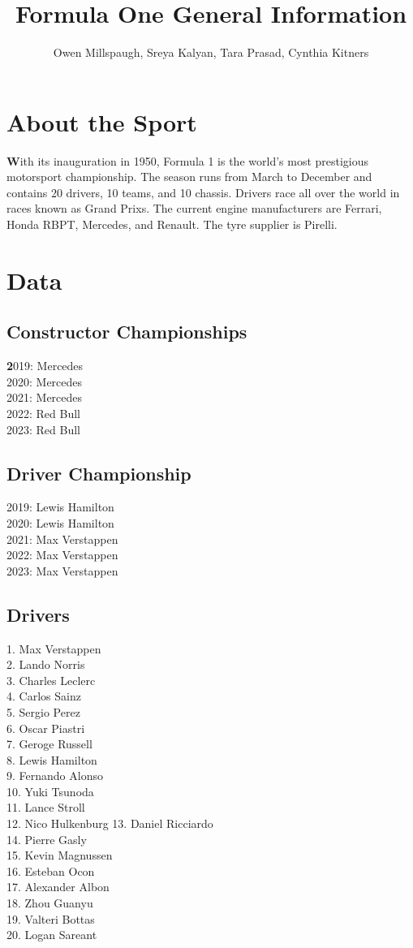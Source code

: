 \documentclass[12pt]{article}
\title{Formula One General Information}
\author{Owen Millspaugh, Sreya Kalyan, Tara Prasad, Cynthia Kitners}
\begin{document}
\maketitle

\section{About the Sport}
\textbf With its inauguration in 1950, Formula 1 is the world's most prestigious motorsport championship. 
The season runs from March to December and contains 20 drivers, 10 teams, and 10 chassis.
Drivers race all over the world in races known as Grand Prixs.
The current engine manufacturers are Ferrari, Honda RBPT, Mercedes, and Renault. 
The tyre supplier is Pirelli.
\section{Data}
\subsection{Constructor Championships}
\textbf 2019: Mercedes\\
2020: Mercedes\\
2021: Mercedes\\
2022: Red Bull\\
2023: Red Bull
\subsection{Driver Championship}
2019: Lewis Hamilton\\
2020: Lewis Hamilton\\
2021: Max Verstappen\\
2022: Max Verstappen\\
2023: Max Verstappen
\subsection{Drivers}
1. Max Verstappen\\
2. Lando Norris\\
3. Charles Leclerc\\
4. Carlos Sainz\\
5. Sergio Perez\\
6. Oscar Piastri\\
7. Geroge Russell\\
8. Lewis Hamilton\\
9. Fernando Alonso\\
10. Yuki Tsunoda\\
11. Lance Stroll\\
12. Nico Hulkenburg
13. Daniel Ricciardo\\
14. Pierre Gasly\\
15. Kevin Magnussen\\
16. Esteban Ocon\\
17. Alexander Albon\\
18. Zhou Guanyu\\
19. Valteri Bottas\\
20. Logan Sareant
\end{document}

